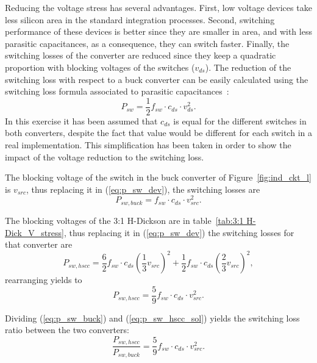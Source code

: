 Reducing the voltage stress has several advantages. First, low voltage devices take less silicon area in the standard integration processes. Second, switching performance of these devices is better since they are smaller in area, and with less parasitic capacitances, as a consequence, they can switch faster. Finally, the switching losses of the converter are reduced since they keep a quadratic proportion with blocking voltages of the switches ($v_{ds}$). The reduction of the switching loss with respect to a buck converter can be easily calculated using the switching loss formula associated to parasitic  capacitances~\cite{2001Erickson}:
\begin{equation}
P_{sw} = \frac{1}{2} f_{sw} \cdot c_{ds} \cdot v_{ds}^2.
\label{eq:p_sw_dev}
\end{equation}
In this exercise it has been assumed that $c_{ds}$ is equal for the different switches in both converters, despite the fact that value would be different for each switch in a real implementation. This simplification has been taken in order to show the impact of the voltage reduction to the switching loss. %

The blocking voltage of the switch in the buck converter of Figure~\ref{fig:ind_ckt_l} is $v_{src}$, thus replacing it in (\ref{eq:p_sw_dev}), the switching losses are
\begin{equation}
P_{sw,buck} =   f_{sw} \cdot c_{ds} \cdot v_{src}^2.
\label{eq:p_sw_buck}
\end{equation}

The blocking voltages of the 3:1 H-Dickson are in table~\ref{tab:3:1 H-Dick_V_stress}, thus replacing it in (\ref{eq:p_sw_dev}) the switching losses for that converter are
\begin{equation}
P_{sw,hscc} =  \frac{6}{2}  f_{sw} \cdot c_{ds} \left( \frac{1}{3} v_{src} \right)^2 + \frac{1}{2}  f_{sw} \cdot c_{ds} \left( \frac{2}{3} v_{src} \right)^2 ,
\label{eq:p_sw_hscc}
\end{equation}
rearranging yields to
\begin{equation}
P_{sw,hscc} =  \frac{5}{9}  f_{sw} \cdot c_{ds} \cdot v_{src}^2.
\label{eq:p_sw_hscc_sol}
\end{equation}

Dividing (\ref{eq:p_sw_buck}) and (\ref{eq:p_sw_hscc_sol}) yields the switching loss ratio between the two converters:
\begin{equation}
\frac{P_{sw,hscc}}{P_{sw,buck}} =  \frac{5}{9}  f_{sw} \cdot c_{ds} \cdot v_{src}^2.
\label{eq:p_sw_hscc_sol}
\end{equation}


